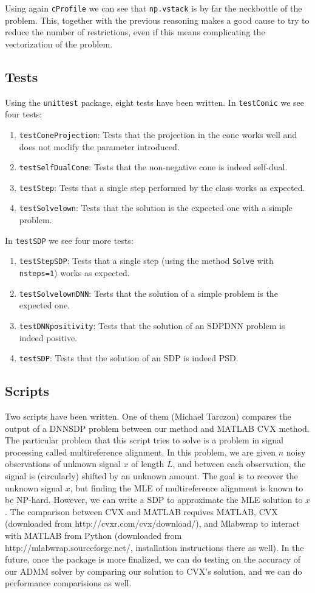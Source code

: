 \documentclass[paper=a4, fontsize=11pt]{scrartcl}
\numberwithin{equation}{section}		%
\numberwithin{figure}{section}			%
\numberwithin{table}{section}				%
\begin{document}
Using again \texttt{cProfile} we can see that \texttt{np.vstack} is by far the neckbottle of the problem. This, together with the previous reasoning makes a good cause to try to reduce the number of restrictions, even if this means complicating the vectorization of the problem.

\subsection{Tests}

Using the \texttt{unittest} package, eight tests have been written.
In \texttt{testConic} we see four tests:
\begin{enumerate}
\item \texttt{testConeProjection}: Tests that the projection in the cone works well and does not modify the parameter introduced.
\item \texttt{testSelfDualCone}: Tests that the non-negative cone is indeed self-dual.
\item \texttt{testStep}: Tests that a single step performed by the class works as expected.
\item \texttt{testSolvelown}: Tests that the solution is the expected one with a simple problem.
\end{enumerate}
In \texttt{testSDP} we see four more tests:
\begin{enumerate}
\item \texttt{testStepSDP}: Tests that a single step (using the method \texttt{Solve} with \texttt{nsteps=1}) works as expected.
\item \texttt{testSolvelownDNN}: Tests that the solution of a simple problem is the expected one.
\item \texttt{testDNNpositivity}: Tests that the solution of an SDPDNN problem is indeed positive.
\item \texttt{testSDP}: Tests that the solution of an SDP is indeed PSD.
\end{enumerate}

\subsection{Scripts}
Two scripts have been written. One of them (Michael Tarczon) compares the output of a DNNSDP problem between our method and MATLAB CVX method.  The particular problem that this script tries to solve is a problem in signal processing called multireference alignment.  In this problem, we are given $n$ noisy observations of unknown signal $x$ of length $L$, and between each observation, the signal is (circularly) shifted by an unknown amount. The goal is to recover the unknown signal $x$, but finding the MLE of multireference alignment is known to be NP-hard.  However, we can write a SDP to approximate the MLE solution to $x$.  The comparison between CVX and MATLAB requives MATLAB, CVX (downloaded from http://cvxr.com/cvx/download/), and Mlabwrap to interact with MATLAB from Python (downloaded from http://mlabwrap.sourceforge.net/, installation instructions there as well). In the future, once the package is more finalized, we can do testing on the accuracy of our ADMM solver by comparing our solution to CVX's solution, and we can do performance comparisions as well.
\end{document}
